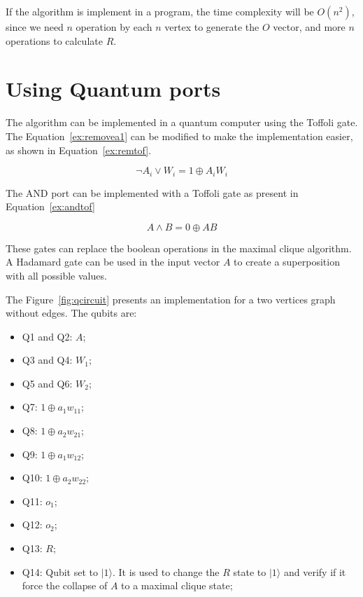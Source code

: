 \documentclass[a4paper,12pt]{article}
\begin{document}
If the algorithm is implement in a program, the time complexity will be $O(n^2)$, since we need $n$ operation by each $n$ vertex to generate the $O$ vector, and more $n$ operations to calculate $R$.

\section{Using Quantum ports}

The algorithm can be implemented in a quantum computer using the Toffoli gate. The Equation~\ref{ex:removea1} can be modified to make the implementation easier, as shown in Equation~\ref{ex:remtof}.

\begin{equation}
	\neg A_i \lor W_i = 1 \oplus A_i W_i \label{ex:remtof}
\end{equation}

The AND port can be implemented with a Toffoli gate as present in Equation~\ref{ex:andtof} 

\begin{equation}
	A \land B = 0 \oplus AB \label{ex:andtof}
\end{equation}

These gates can replace the boolean operations in the maximal clique algorithm. A Hadamard gate can be used in the input vector $A$ to create a superposition with all possible values.

The Figure~\ref{fig:qcircuit} presents an implementation for a two vertices graph without edges. The qubits are:

\begin{itemize}
	\item Q1 and Q2: $A$;
	\item Q3 and Q4: $W_1$;
	\item Q5 and Q6: $W_2$;
	\item Q7: $1 \oplus a_1 w_{11}$;
	\item Q8: $1 \oplus a_2 w_{21}$;
	\item Q9: $1 \oplus a_1 w_{12}$;
	\item Q10: $1 \oplus a_2 w_{22}$;
	\item Q11: $o_{1}$;
	\item Q12: $o_{2}$;
	\item Q13: $R$;
	\item Q14: Qubit set to $|1\rangle$. It is used to change the $R$ state to $|1\rangle$ and verify if it force the collapse of $A$ to a maximal clique state; 
\end{itemize}
\end{document}

